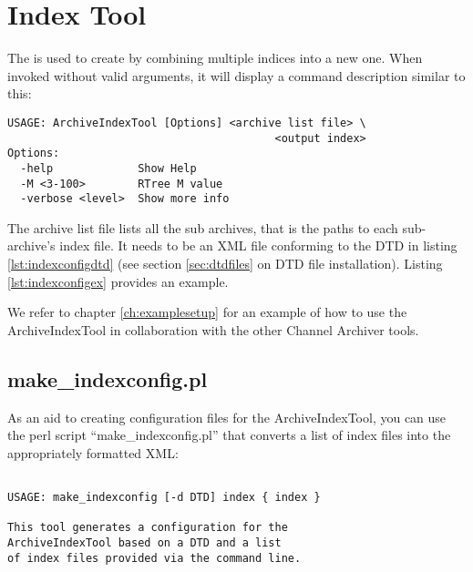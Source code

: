 \section{Index Tool} \label{sec:indextool}
The  is used to create 
by combining multiple indices into a new one.  When invoked without
valid arguments, it will display a command description similar to
this:

\begin{lstlisting}[frame=none,keywordstyle=\sffamily]
USAGE: ArchiveIndexTool [Options] <archive list file> \
                                         <output index> 
Options:
  -help             Show Help
  -M <3-100>        RTree M value
  -verbose <level>  Show more info
\end{lstlisting}

\noindent The archive list file lists all the sub archives,
that is the paths to each sub-archive's index file. It needs to be an
XML file conforming to the DTD in listing \ref{lst:indexconfigdtd}
(see section \ref{sec:dtdfiles} on DTD file installation).
Listing \ref{lst:indexconfigex} provides an example.





We refer to chapter \ref{ch:examplesetup} for an example of how to use
the ArchiveIndexTool in collaboration with the other Channel Archiver
tools.

\subsection{make\_indexconfig.pl} \label{sec:makeindexconfig}
As an aid to creating configuration files for the ArchiveIndexTool,
you can use the perl script ``make\_indexconfig.pl'' that converts a
list of index files into the appropriately formatted XML:
\begin{lstlisting}[frame=none,keywordstyle=\sffamily]

USAGE: make_indexconfig [-d DTD] index { index }
 
This tool generates a configuration for the
ArchiveIndexTool based on a DTD and a list
of index files provided via the command line.
\end{lstlisting}

